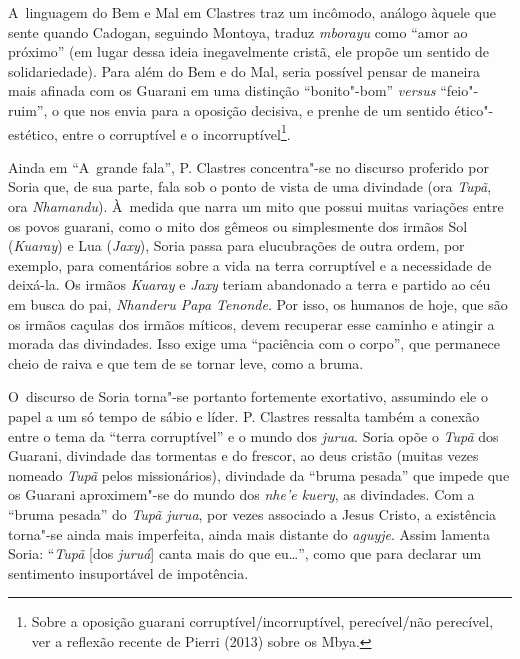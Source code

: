 A~linguagem do Bem e Mal em Clastres traz um incômodo, análogo àquele
que sente quando Cadogan, seguindo Montoya, traduz \emph{mborayu} como ``amor
ao próximo'' (em lugar dessa ideia inegavelmente cristã, ele propõe um sentido
de solidariedade). Para além do Bem e do Mal, seria
possível pensar de maneira mais afinada com os Guarani em uma distinção
``bonito"-bom'' \emph{versus} ``feio"-ruim'', o que nos envia para a oposição decisiva,
e prenhe de um sentido ético"-estético, entre o corruptível e o
incorruptível\footnote{Sobre a oposição guarani
corruptível/incorruptível, perecível/não perecível, ver a reflexão
recente de Pierri (2013) sobre os Mbya. }. 

Ainda em ``A~grande fala'', P. Clastres concentra"-se no discurso proferido
por Soria que, de sua parte, fala sob o ponto de vista de uma divindade
(ora \emph{Tupã}, ora \emph{Nhamandu}). À~medida que narra um mito que possui muitas
variações entre os povos guarani, como o mito dos gêmeos ou
simplesmente dos irmãos Sol (\emph{Kuaray}) e Lua (\emph{Jaxy}), Soria passa para
elucubrações de outra ordem, por exemplo, para comentários sobre a vida
na terra corruptível e a necessidade de deixá-la. Os irmãos \emph{Kuaray} e
\emph{Jaxy} teriam abandonado a terra e partido ao céu em busca do pai,
\emph{Nhanderu Papa Tenonde}. Por isso, os humanos de hoje, que são os irmãos
caçulas dos irmãos míticos, devem recuperar esse caminho e atingir a
morada das divindades. Isso exige uma ``paciência com o corpo'', que
permanece cheio de raiva e que tem de se tornar leve, como a bruma. 

O~discurso de Soria torna"-se portanto fortemente exortativo, assumindo
ele o papel a um só tempo de sábio e líder. P. Clastres ressalta também
a conexão entre o tema da ``terra corruptível'' e o mundo dos \emph{jurua}.
Soria opõe o \emph{Tupã} dos Guarani, divindade das tormentas e do frescor, ao
deus cristão (muitas vezes nomeado \emph{Tupã} pelos missionários), divindade
da ``bruma pesada'' que impede que os Guarani aproximem"-se do mundo dos
\emph{nhe’e kuery}, as divindades. Com a ``bruma pesada'' do \emph{Tupã} \emph{jurua}, por
vezes associado a Jesus Cristo, a existência torna"-se ainda mais
imperfeita, ainda mais distante do \emph{aguyje}. Assim lamenta Soria: ``\emph{Tupã}
[dos \emph{juruá}] canta mais do que eu\ldots{}'', como que para declarar um
sentimento insuportável de impotência. 

